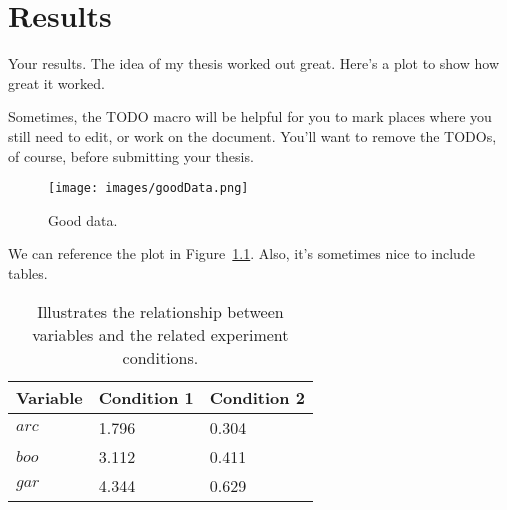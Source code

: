 \chapter{Results}
\label{chap:results}

Your results.  The idea of my thesis worked out great.  Here's a plot to show how great it worked.  

Sometimes, the TODO macro will be helpful for you to mark places where you still need to edit, or work on the document.  You'll want to remove the TODOs, of course, before submitting your thesis.

\begin{figure}
\centering
\texttt{[image: images/goodData.png]}
\caption{Good data.}
\label{fig:goodData}
\end{figure} 

We can reference the plot in Figure~\ref{fig:goodData}. Also, it's sometimes nice to include tables.

\begin{table}
\begin{center}
  \begin{tabular}{ | l | l | l | }
    \hline
    Variable & Condition 1 & Condition 2 \\ \hline
    \(arc\) & 1.796 & 0.304 \\ \hline 
    \(boo\) & 3.112 & 0.411 \\ \hline 
    \(gar\) & 4.344 & 0.629 \\ 
    \hline
  \end{tabular}
\end{center}
\caption{Illustrates the relationship between variables and the related experiment conditions.}
\label{tid:dataCond12}
\end{table}

